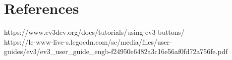 \section{References}
https://www.ev3dev.org/docs/tutorials/using-ev3-buttons/ \\
https://le-www-live-s.legocdn.com/sc/media/files/user-guides/ev3/ev3_user_guide_engb-f24950e6482a3c16e56af0fd72a756fe.pdf 